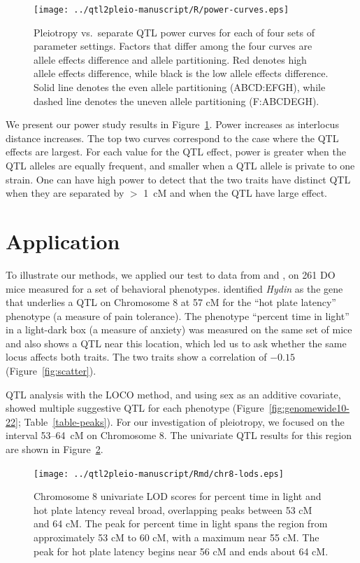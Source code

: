\documentclass[oneside]{book}\usepackage[]{graphicx}\usepackage[]{color}
\begin{document}
\begin{figure}
\texttt{[image: ../qtl2pleio-manuscript/R/power-curves.eps]}
\caption{Pleiotropy vs.\ separate QTL power curves for each of four
  sets of parameter settings. Factors that differ among the four
  curves are allele effects difference and allele partitioning. Red denotes high allele effects difference, while black is the low allele effects difference. Solid line denotes the even allele partitioning (ABCD:EFGH), while dashed line denotes the uneven allele partitioning (F:ABCDEGH).}
\label{fig:power}
\end{figure}

We present our power study results in Figure~\ref{fig:power}.
Power increases as interlocus distance increases. The top two curves
correspond to the case where the QTL effects are largest. For each value
for the QTL effect, power is greater when the QTL alleles are equally
frequent, and smaller when a QTL allele is private to one strain. One
can have high power to detect that the two traits have distinct QTL
when they are separated by $>$ 1~cM and when the QTL have large effect.


\section{Application}
\label{sec:app}

To illustrate our methods, we applied our test to data from
\citet{logan2013high} and \citet{recla2014precise}, on 261 DO mice
measured for a set of behavioral phenotypes.
\citet{recla2014precise} identified \textit{Hydin} as the gene that
underlies a QTL on Chromosome 8 at 57 cM for the ``hot plate latency''
phenotype (a measure of pain tolerance). The phenotype ``percent time in light''
in a light-dark box (a measure of anxiety) was
measured on the same set of mice \citep{logan2013high} and also shows a QTL near
this location, which led us to ask whether the same locus affects both traits.
The two traits show a correlation of $-0.15$ (Figure~\ref{fig:scatter}).

QTL analysis with the LOCO method, and using sex as an additive
covariate, showed multiple suggestive QTL for each
phenotype (Figure~\ref{fig:genomewide10-22}; Table~\ref{table-peaks}). For our investigation of
pleiotropy, we focused on the interval 53--64~cM on Chromosome 8.
The univariate QTL results for this region are shown in
Figure~\ref{fig:chr8-lod}.

\begin{figure}
\texttt{[image: ../qtl2pleio-manuscript/Rmd/chr8-lods.eps]}
\caption{Chromosome 8 univariate LOD scores for percent time in light
  and hot plate latency reveal broad, overlapping peaks between 53 cM
  and 64 cM. The peak for percent time in light spans the region from
  approximately 53 cM to 60 cM, with a maximum near 55 cM. The peak
  for hot plate latency begins near 56 cM and ends about 64 cM.}
\label{fig:chr8-lod}
\end{figure}
\end{document}
